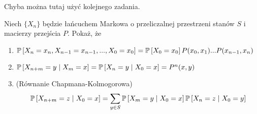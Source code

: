 \begin{solution}
  Chyba można tutaj użyć kolejnego zadania.
\end{solution}

\begin{problem}
  Niech $\{X_n\}$ będzie łańcuchem Markowa o przeliczalnej przestrzeni stanów $S$ i macierzy przejścia $P$. Pokaż, że 
  \begin{enumerate}
    \item $\prob{X_n=x_n,X_{n-1}=x_{n-1},...,X_0=x_0}=\prob{X_0=x_0}P(x_0,x_1)...P(x_{n-1},x_n)$
    \item $\prob{X_{n+m}=y}{X_m=x}=\prob{X_n=y}{X_0=x}=P^n(x, y)$
    \item (Równanie Chapmana-Kolmogorowa)
      $$\prob{X_{n+m}=z}{X_0=x}=\sum_{y\in S}\prob{X_m=y}{X_0=x}\prob{X_n=z}{X_0=y}$$
  \end{enumerate}
\end{problem}

